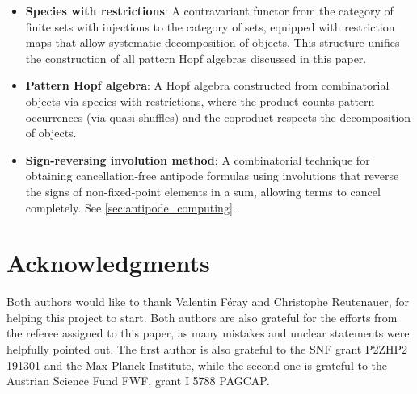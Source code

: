 \documentclass[12pt, reqno]{amsart}
\theoremstyle{definition}
\begin{document}
\begin{itemize}
\item \textbf{Species with restrictions}: A contravariant functor from the category of finite sets with injections to the category of sets, equipped with restriction maps that allow systematic decomposition of objects. This structure unifies the construction of all pattern Hopf algebras discussed in this paper.

\item \textbf{Pattern Hopf algebra}: A Hopf algebra constructed from combinatorial objects via species with restrictions, where the product counts pattern occurrences (via quasi-shuffles) and the coproduct respects the decomposition of objects.

\item \textbf{Sign-reversing involution method}: A combinatorial technique for obtaining cancellation-free antipode formulas using involutions that reverse the signs of non-fixed-point elements in a sum, allowing terms to cancel completely. See \cref{sec:antipode_computing}.

\end{itemize}

\section*{Acknowledgments}

Both authors would like to thank Valentin F\'eray and Christophe Reutenauer, for helping this project to start.
Both authors are also grateful for the efforts from the referee assigned to this paper, as many mistakes and unclear statements were helpfully pointed out.
The first author is also grateful to the SNF grant P2ZHP2 191301 and the Max Planck Institute, while the second one is grateful to the Austrian Science Fund FWF, grant I 5788 PAGCAP.


%
%




\end{document}
